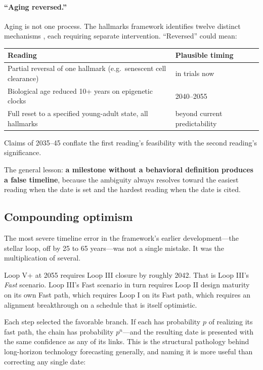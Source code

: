 \documentclass[11pt]{article}
\begin{document}
\paragraph{``Aging reversed.''} Aging is not one process. The hallmarks framework identifies twelve distinct mechanisms \citep{lopezotin2013,lopezotin2023}, each requiring separate intervention. ``Reversed'' could mean:

\begin{table}[h]
\centering
\footnotesize
\begin{tabular}{@{}L{8.4cm}l@{}}
\toprule
Reading & Plausible timing \\
\midrule
Partial reversal of one hallmark (e.g.\ senescent cell clearance) & in trials now \\
Biological age reduced 10+ years on epigenetic clocks & 2040--2055 \\
Full reset to a specified young-adult state, all hallmarks & beyond current predictability \\
\bottomrule
\end{tabular}
\end{table}

Claims of 2035--45 conflate the first reading's feasibility with the second reading's significance.

The general lesson: \textbf{a milestone without a behavioral definition produces a false timeline}, because the ambiguity always resolves toward the easiest reading when the date is set and the hardest reading when the date is cited.

\subsection{Compounding optimism}

The most severe timeline error in the framework's earlier development---the stellar loop, off by 25 to 65 years---was not a single mistake. It was the multiplication of several.

Loop V+ at 2055 requires Loop III closure by roughly 2042. That is Loop III's \emph{Fast} scenario. Loop III's Fast scenario in turn requires Loop II design maturity on its own Fast path, which requires Loop I on its Fast path, which requires an alignment breakthrough on a schedule that is itself optimistic.

Each step selected the favorable branch. If each has probability $p$ of realizing its fast path, the chain has probability $p^n$---and the resulting date is presented with the same confidence as any of its links. This is the structural pathology behind long-horizon technology forecasting generally, and naming it is more useful than correcting any single date:
\end{document}
